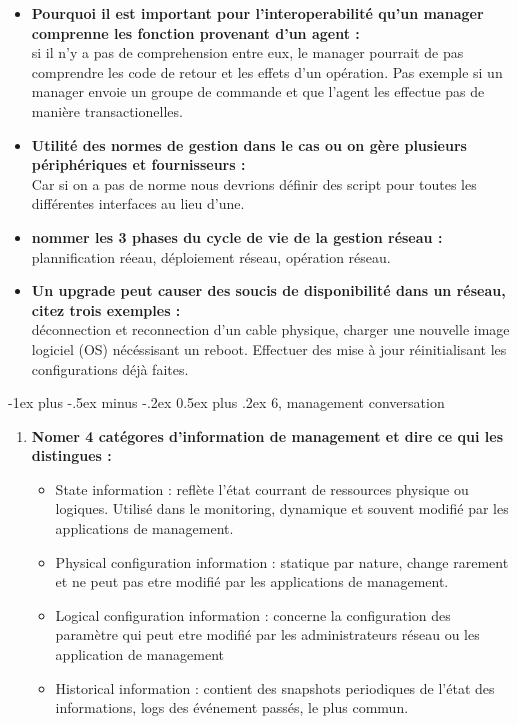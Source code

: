 \documentclass[12pt,landscape]{article}
\makeatletter
\renewcommand{\section}{\@startsection{section}{1}{0mm}%
                                {-1ex plus -.5ex minus -.2ex}%
                                {0.5ex plus .2ex}%
                                {\normalfont\large\bfseries}}
\makeatother
\begin{document}
\begin{multicols}{2}
\begin{itemize}
 \item \textbf{Pourquoi il est important pour l'interoperabilité qu'un manager comprenne les fonction provenant d'un agent : }\\
 si il n'y a pas de comprehension entre eux, le manager pourrait de pas comprendre les code de retour et les effets d'un opération. Pas exemple si un manager envoie un groupe de  commande et que l'agent les effectue pas de manière transactionelles.
 
 \item \textbf{Utilité des normes de gestion dans le cas ou on gère plusieurs périphériques et fournisseurs : }\\
 Car si on a pas de norme nous devrions définir des script pour toutes les différentes interfaces au lieu d'une.
 
 \item \textbf{nommer les 3 phases du cycle de vie de la gestion réseau : }\\
 plannification réeau, déploiement réseau, opération réseau.
 
 \item \textbf{Un upgrade peut causer des soucis de disponibilité dans un réseau, citez trois exemples :}\\
 déconnection et reconnection d'un cable physique, charger une nouvelle image logiciel (OS) nécéssisant un reboot. Effectuer des mise à jour réinitialisant les configurations déjà faites.
 
 
\end{itemize}


\section{6, management conversation}

\begin{enumerate}

\item \textbf{Nomer 4 catégores d'information de management et dire ce qui les distingues :}
\begin{itemize}
\item State information : reflète l'état courrant de ressources physique ou logiques. Utilisé dans le monitoring, dynamique et souvent modifié par les applications de management.
\item Physical configuration information : statique par nature, change rarement et ne peut pas etre modifié par les applications de management.
\item Logical configuration information  : concerne la configuration des paramètre qui peut etre modifié par les administrateurs réseau ou les application de management
\item Historical information : contient des snapshots periodiques de l'état des informations, logs des événement passés, le plus commun.
\end{itemize}


\end{enumerate}
\end{multicols}
\end{document}
